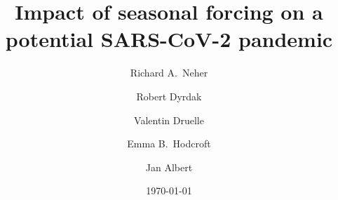 \documentclass[rmp, reprint, superscriptaddress, floatfix,amsmath]{revtex4-1}
\begin{document}
\title{Impact of seasonal forcing on a potential SARS-CoV-2 pandemic}

\author{Richard A.~Neher}
\address{Biozentrum, University of Basel, Basel, Switzerland }
\address{Swiss Institute of Bioinformatics, Basel, Switzerland }
\author{Robert Dyrdak}
\address{Department of Clinical Microbiology, Karolinska University Hospital, Stockholm, Sweden }
\address{Department of Microbiology, Tumor and Cell Biology, Karolinska Institute, Stockholm, Sweden }
\author{Valentin Druelle}
\address{Biozentrum, University of Basel, Basel, Switzerland }
\address{Swiss Institute of Bioinformatics, Basel, Switzerland }
\author{Emma B.~Hodcroft}
\address{Biozentrum, University of Basel, Basel, Switzerland }
\address{Swiss Institute of Bioinformatics, Basel, Switzerland }
\author{Jan Albert}
\address{Department of Clinical Microbiology, Karolinska University Hospital, Stockholm, Sweden }
\address{Department of Microbiology, Tumor and Cell Biology, Karolinska Institute, Stockholm, Sweden }

\date{\today}
\end{document}
